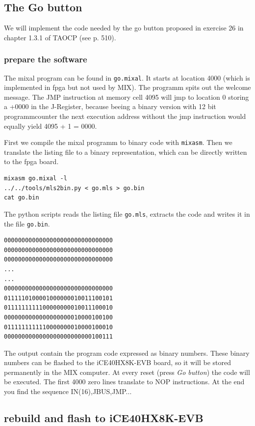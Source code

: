\documentclass[a4paper,ngerman]{scrartcl}
\begin{document}
\subsection{The Go button}
We will implement the code needed by the go button proposed in  exercise 26 in chapter 1.3.1 of TAOCP (see p. 510).

\subsubsection{prepare the software}
The mixal program can be found in \lstinline|go.mixal|. It starts at location 4000 (which is implemented in fpga but not used by MIX). The programm spits out the welcome message. The JMP instruction at memory cell 4095 will jmp to location 0 storing a +0000 in the J-Register, because beeing a binary version with 12 bit programmcounter the next execution address without the jmp instruction would equally yield 4095 + 1 = 0000.




First we compile the mixal programm to binary code with \lstinline|mixasm|. Then we translate the listing file to a binary representation, which can be directly written to the fpga board.

\begin{lstlisting}[numbers=none,frame=none]
mixasm go.mixal -l
../../tools/mls2bin.py < go.mls > go.bin
cat go.bin
\end{lstlisting}

The python scripts reads the listing file \lstinline|go.mls|, extracts the code and writes it in the file \lstinline|go.bin|.

\begin{lstlisting}
0000000000000000000000000000000
0000000000000000000000000000000
0000000000000000000000000000000
...
...
0000000000000000000000000000000
0111110100001000000010011100101
0111111111100000000010011100010
0000000000000000000010000100100
0111111111110000000010000100010
0000000000000000000000000100111
\end{lstlisting}

The output contain the program code expressed as binary numbers. These binary numbers can be flashed to the iCE40HX8K-EVB board, so it will be stored permanently in the MIX computer. At every reset (press \textit{Go button}) the code will be executed. The first 4000 zero lines translate to NOP instructions. At the end you find the sequence IN(16),JBUS,JMP...

\subsection{rebuild and flash to iCE40HX8K-EVB}
\end{document}
